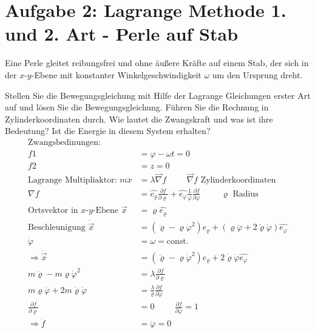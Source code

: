 \section*{Aufgabe 2: Lagrange Methode 1. und 2. Art - Perle auf Stab}
Eine Perle gleitet reibungsfrei und ohne äußere Kräfte auf einem Stab, der sich in der $x$-$y$-Ebene mit konstanter Winkelgeschwindigkeit $\omega$ um den Ursprung dreht.
\begin{enumeralph}
	\item Stellen Sie die Bewegungsgleichung mit Hilfe der Lagrange Gleichungen erster Art auf und lösen Sie die Bewegungsgleichung. Führen Sie die Rechnung in Zylinderkoordinaten durch. Wie lautet die Zwangskraft und was ist ihre Bedeutung? Ist die Energie in diesem System erhalten?
\begin{align*}
\text{Zwangsbedinungen:}\\
f1&=\varphi-\omega t = 0\\
f2&=z=0\\
\text{Lagrange Multipliaktor: }m\ddot{x}&=\lambda\overrightarrow{\nabla}f\hspace{1cm}\overrightarrow{\nabla}f \text{ Zylinderkoordinaten}\\
\nabla f&=\hat{e_\varrho}\frac{\partial f}{\partial \varrho}+\hat{e_\varphi}\frac{1}{\varphi}\frac{\partial f}{\partial\varphi}\hspace{1cm}\varrho\text{ Radius}\\
\text{Ortsvektor in $x$-$y$-Ebene }\overrightarrow{x}&=\varrho\hat{e_\varrho}\\
\text{Beschleunigung }\ddot{\overrightarrow{x}}&=(\ddot{\varrho}-\varrho\dot{\varphi}^2)\hat{e_\varrho}+(\varrho\ddot{\varphi}+2\dot{\varrho}\dot{\varphi})\hat{e_\varphi}\\
\dot{\varphi}&=\omega=\text{const.}\\
\Rightarrow\ddot{\overrightarrow{x}}&=(\ddot{\varrho}-\varrho\dot{\varphi}^2)\hat{e_\varrho}+2\dot{\varrho}\dot{\varphi}\hat{e_\varphi}\\
m\ddot{\varrho}-m\varrho\dot{\varphi}^2&=\lambda\frac{\partial f}{\partial \varrho}\\
m\varrho\ddot{\varphi}+2m\dot{\varrho}\dot{\varphi}&=\frac{\lambda}{\varrho}\frac{\partial f}{\partial \varphi}\\
 \frac{\partial f}{\partial \varrho}&=0\hspace{1cm}\frac{\partial f}{\partial \varphi}=1\\
 \Rightarrow\ddot{f}&=\ddot{\varphi}=0\\

\end{align*}
\end{enumeralph}
